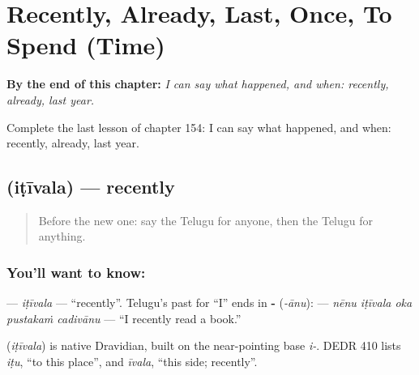 
\chapter{Recently, Already, Last, Once, To Spend (Time)}
\label{ch:te-recently-already-last-once-to-spend-time}

\begin{chapteropening}
\textbf{By the end of this chapter:} \emph{I can say what happened, and when: recently, already, last year.}

Complete the last lesson of chapter 154: I can say what happened, and when: recently, already, last year.
\end{chapteropening}

\section[\texorpdfstring{\te{ఇటీవల} (iṭīvala)}{ఇటీవల (iṭīvala)}]{ (iṭīvala) — recently}

\label{lesson:TE-C154-itivala}



\begin{quote}
Before the new one: say the Telugu for anyone, then the Telugu for anything.
\end{quote}

\subsection*{You'll want to know: }
\textbf{} — \emph{iṭīvala} — \textquotedblleft{}recently\textquotedblright{}. Telugu's past for \textquotedblleft{}I\textquotedblright{} ends in \textbf{-} (\emph{-ānu}): \textbf{    } — \emph{nēnu iṭīvala oka pustakaṁ cadivānu} — \textquotedblleft{}I recently read a book.\textquotedblright{}

\begin{cousinweb}
\textbf{} (\emph{iṭīvala}) is native Dravidian, built on the near-pointing base \emph{i-}. DEDR 410 lists \emph{iṭu}, \textquotedblleft{}to this place\textquotedblright{}, and \emph{īvala}, \textquotedblleft{}this side; recently\textquotedblright{}.
\end{cousinweb}

